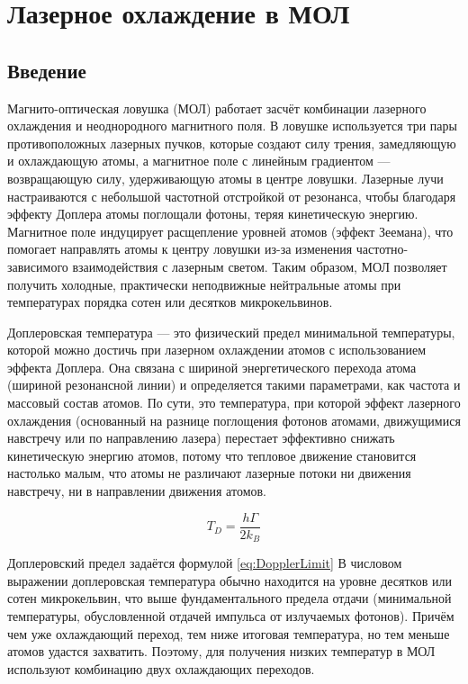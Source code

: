 \chapter{Лазерное охлаждение в МОЛ}\label{ch:ch1}

\section{Введение}

Магнито-оптическая ловушка (МОЛ) работает засчёт комбинации лазерного охлаждения и неоднородного магнитного поля. 
В ловушке используется три пары противоположных лазерных пучков, которые создают силу трения, замедляющую и охлаждающую атомы, а магнитное поле с линейным градиентом — возвращающую силу, удерживающую атомы в центре ловушки. 
Лазерные лучи настраиваются с небольшой частотной отстройкой от резонанса, чтобы благодаря эффекту Доплера атомы поглощали фотоны, теряя кинетическую энергию. 
Магнитное поле индуцирует расщепление уровней атомов (эффект Зеемана), что помогает направлять атомы к центру ловушки из-за изменения частотно-зависимого взаимодействия с лазерным светом. 
Таким образом, МОЛ позволяет получить холодные, практически неподвижные нейтральные атомы при температурах порядка сотен или десятков микрокельвинов.

Доплеровская температура — это физический предел минимальной температуры, которой можно достичь при лазерном охлаждении атомов с использованием эффекта Доплера. 
Она связана с шириной энергетического перехода атома (шириной резонансной линии) и определяется такими параметрами, как частота и массовый состав атомов. 
По сути, это температура, при которой эффект лазерного охлаждения (основанный на разнице поглощения фотонов атомами, движущимися навстречу или по направлению лазера) перестает эффективно снижать кинетическую энергию атомов, потому что тепловое движение становится настолько малым, что атомы не различают лазерные потоки ни движения навстречу, ни в направлении движения атомов.

\begin{equation}
	\label{eq:DopplerLimit}
	T_D = \frac{h \Gamma}{2 k_B}
\end{equation}

Доплеровский предел задаётся формулой \ref{eq:DopplerLimit}
В числовом выражении доплеровская температура обычно находится на уровне десятков или сотен микрокельвин, что выше фундаментального предела отдачи (минимальной температуры, обусловленной отдачей импульса от излучаемых фотонов).
Причём чем уже охлаждающий переход, тем ниже итоговая температура, но тем меньше атомов удастся захватить. 
Поэтому, для получения низких температур в МОЛ используют комбинацию двух охлаждающих переходов.


